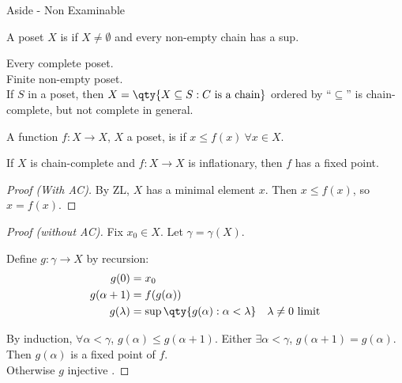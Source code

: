\begin{aside}{Aside - Non Examinable}
    \begin{definition}
        A poset $X$ is  if $X \neq \emptyset$ and every non-empty chain has a sup.
    \end{definition}

    \begin{example}
        Every complete poset. \\
        Finite non-empty poset. \\
        If $S$ in a poset, then $X = \qty{X \subseteq S : C \text{ is a chain}}$ ordered by ``$\subseteq$'' is chain-complete, but not complete in general.
    \end{example}

    \begin{definition}[Inflationary]
        A function $f : X \to X$, $X$ a poset, is  if $x \leq f(x) \ \forall x \in X$.
    \end{definition}

    \begin{theorem}
        If $X$ is chain-complete and $f : X \to X$ is inflationary, then $f$ has a fixed point.
    \end{theorem}

    \begin{proof}[Proof (With AC)]
        By ZL, $X$ has a minimal element $x$.
        Then $x \leq f(x)$, so $x = f(x)$.
    \end{proof}

    \begin{proof}[Proof (without AC)]
        Fix $x_0 \in X$.
        Let $\gamma = \gamma(X)$.

        Define $g : \gamma \to X$ by recursion:
        \begin{align*}
            g(0) &= x_0 \\
            g(\alpha + 1) &= f(g(\alpha)) \\
            g(\lambda) &= \sup \qty{g(\alpha) : \alpha < \lambda} \quad \text{$\lambda \neq 0$ limit}
        \end{align*}

        By induction, $\forall \alpha < \gamma$, $g(\alpha) \leq g(\alpha + 1)$.
        Either $\exists \alpha < \gamma$, $g(\alpha + 1) = g(\alpha)$.
        Then $g(\alpha)$ is a fixed point of $f$. \\
        Otherwise $g$ injective \Lightning.
    \end{proof}


\end{aside}
